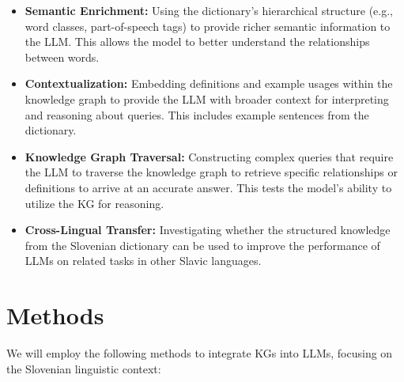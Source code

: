 \documentclass[fleqn,moreauthors,10pt]{ds_report}
\begin{document}
\begin{itemize}[noitemsep]
    \item \textbf{Semantic Enrichment:} Using the dictionary's hierarchical structure (e.g., word classes, part-of-speech tags) to provide richer semantic information to the LLM. This allows the model to better understand the relationships between words.
    \item \textbf{Contextualization:} Embedding definitions and example usages within the knowledge graph to provide the LLM with broader context for interpreting and reasoning about queries.  This includes example sentences from the dictionary.
    \item \textbf{Knowledge Graph Traversal:} Constructing complex queries that require the LLM to traverse the knowledge graph to retrieve specific relationships or definitions to arrive at an accurate answer. This tests the model's ability to utilize the KG for reasoning.
    \item \textbf{Cross-Lingual Transfer:} Investigating whether the structured knowledge from the Slovenian dictionary can be used to improve the performance of LLMs on related tasks in other Slavic languages.
\end{itemize}

\section*{Methods}

We will employ the following methods to integrate KGs into LLMs, focusing on the Slovenian linguistic context:
\end{document}
